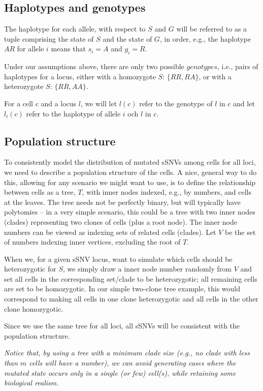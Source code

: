 \documentclass[a4paper,11pt]{article}
\begin{document}
\subsection{Haplotypes and genotypes}
\label{sec:haplotypes-genotypes}

The haplotype for each allele, with respect to $S$ and $G$ will be
referred to as a tuple comprising the state of $S$ and the state of
$G$, in order, e.g., the haplotype $AR$ for allele
$i$ means that $s_i=A$ and $g_i=R$.

Under our assumptions above, there are only two possible $genotypes$,
i.e., pairs of haplotypes for a locus, either with a homozygote $S$:
$\{RR,RA\}$, or with a heterozygote $S$: $\{RR,AA\}$.

For a cell $c$ and a locus $l$, we will let $l(c)$ refer to the
genotype of $l$ in $c$ and let $l_i(c)$ refer to the haplotype of
allele $i$ och $l$ in $c$.


\subsection{Population structure}
\label{sec:population-structure}

To consistently model the distribution of mutated sSNVs among cells
for all loci, we need to describe a population structure of the cells.
A nice, general way to do this, allowing for any scenario we might
want to use, is to define the relationship between cells as a tree,
$T$, with inner nodes indexed, e.g., by numbers, and cells at the leaves. The
tree needs not be perfectly binary, but will typically have polytomies
-- in a very simple scenario, this could be a tree with two inner
nodes (clades) representing two clones of cells (plus a root
node). The inner node numbers can be viewed as indexing sets of
related cells (clades). Let $V$ be the set of numbers indexing inner vertices,
excluding the root of $T$.

When we, for a given sSNV locus, want to simulate which cells should
be heterozygotic for $S$, we simply draw a inner node number randomly
from $V$ and set all cells in the corresponding
set/clade to be heterozygotic; all remaining cells are set to be
homozygotic.  In our simple two-clone tree example, this would
correspond to making all cells in one clone heterozygotic and all
cells in the other clone homozygotic.

Since we use the same tree for all loci, all sSNVs will be consistent
with the population structure.

\emph{Notice that, by using a tree with a minimum clade size (e.g., no clade
  with less than $m$ cells will have a number), we can avoid generating cases
  where the mutated state occurs only in a single (or few) cell(s),
  while retaining some biological realism.}
\end{document}

